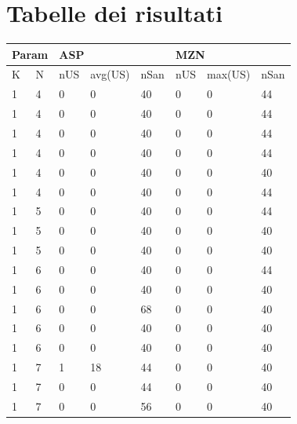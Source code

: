 \documentclass[12pt, italian, openany]{book}
\begin{document}
\chapter{Tabelle dei risultati}
\begin{table}[h]
\begin{tabular}{ll|lll|lll}
\multicolumn{2}{l|}{Param} & \multicolumn{3}{l|}{ASP} & \multicolumn{3}{l}{MZN} \\ \hline
K             & N              & nUS    & avg(US)   & nSan     & nUS      & max(US)     & nSan     \\ \hline
1           & 4            & 0    & 0         & 40    & 0    & 0         & 44   \\
1           & 4            & 0    & 0         & 40    & 0    & 0         & 44   \\
1           & 4            & 0    & 0         & 40    & 0    & 0         & 44   \\
1           & 4            & 0    & 0         & 40    & 0    & 0         & 44   \\
1           & 4            & 0    & 0         & 40    & 0    & 0         & 40   \\
1           & 4            & 0    & 0         & 40    & 0    & 0         & 44   \\
1           & 5            & 0    & 0         & 40    & 0    & 0         & 44   \\
1           & 5            & 0    & 0         & 40    & 0    & 0         & 40   \\
1           & 5            & 0    & 0         & 40    & 0    & 0         & 40   \\
1           & 6            & 0    & 0         & 40    & 0    & 0         & 44   \\
1           & 6            & 0    & 0         & 40    & 0    & 0         & 40   \\
1           & 6            & 0    & 0         & 68    & 0    & 0         & 40   \\
1           & 6            & 0    & 0         & 40    & 0    & 0         & 40   \\
1           & 6            & 0    & 0         & 40    & 0    & 0         & 40   \\
1           & 7            & 1    & 18        & 44    & 0    & 0         & 40   \\
1           & 7            & 0    & 0         & 44    & 0    & 0         & 40   \\
1           & 7            & 0    & 0         & 56    & 0    & 0         & 40   \\

\end{tabular}
\end{table}
\end{document}
